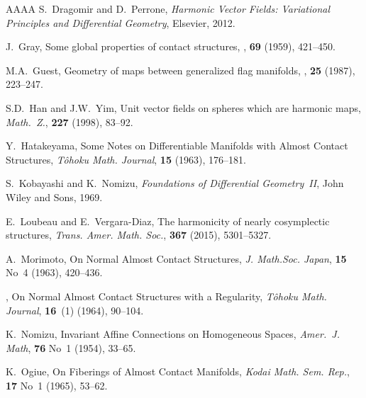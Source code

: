\documentclass[a4paper,reqno]{amsart}
\theoremstyle{definition}
\theoremstyle{remark}
\theoremstyle{plain}
\numberwithin{equation}{section}
\begin{document}
\begin{thebibliography}{AAAA}
  S.~Dragomir and D.~Perrone, \emph{Harmonic
      Vector Fields: Variational Principles and Differential
      Geometry}, Elsevier, 2012.

    


J.~Gray, 
\newblock Some global properties of contact structures, 
, {\bf 69} (1959), 421--450. 

M.A.~Guest, 
\newblock Geometry of maps between generalized flag manifolds, 
, {\bf 25} (1987), 223--247. 

 S.D.~Han and J.W.~Yim, Unit vector fields
      on spheres which are harmonic maps, \emph{Math.~Z.},
      \textbf{227} (1998), 83--92.
  
   Y.~Hatakeyama, Some Notes on
Differentiable Manifolds with Almost Contact Structures,
\emph{T\^ohoku Math. Journal}, \textbf{15} (1963), 176--181.

 S.~Kobayashi and K.~Nomizu, \emph{Foundations of
Differential Geometry~II}, John Wiley and Sons, 1969.

  
E.~Loubeau and E.~Vergara-Diaz, 
\newblock The harmonicity of nearly cosymplectic structures, 
\newblock \textit{Trans. Amer. Math. Soc.}, {\bf 367} (2015), 5301--5327. 


   A.~Morimoto, On Normal Almost Contact
Structures, \emph{J. Math.Soc. Japan}, \textbf{15} No~4 (1963),
420--436.

     \bysame, On Normal Almost Contact
Structures with a Regularity, \emph{T\^ohoku Math. Journal},
\textbf{16}~(1) (1964), 90--104.

  K.~Nomizu, Invariant Affine Connections on
Homogeneous Spaces, \emph{Amer.~J. Math}, \textbf{76} No~1
(1954), 33--65.

     K.~Ogiue, On Fiberings of Almost Contact
Manifolds, \emph{Kodai Math. Sem. Rep.}, \textbf{17} No~1 (1965),
53--62.



\end{thebibliography}
\end{document}
